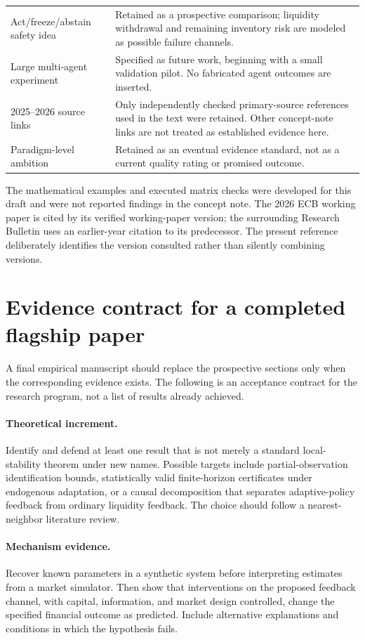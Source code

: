 \documentclass[11pt,a4paper]{article}
\theoremstyle{definition}
\theoremstyle{remark}
\begin{document}
\begin{longtable}{p{}p{}}
Act/freeze/abstain safety idea & Retained as a prospective comparison; liquidity withdrawal and remaining inventory risk are modeled as possible failure channels.\\
Large multi-agent experiment & Specified as future work, beginning with a small validation pilot. No fabricated agent outcomes are inserted.\\
2025--2026 source links & Only independently checked primary-source references used in the text were retained. Other concept-note links are not treated as established evidence here.\\
Paradigm-level ambition & Retained as an eventual evidence standard, not as a current quality rating or promised outcome.\\
\end{longtable}
The mathematical examples and executed matrix checks were developed for this draft and were not reported findings in the concept note. The 2026 ECB working paper is cited by its verified working-paper version; the surrounding Research Bulletin uses an earlier-year citation to its predecessor. The present reference deliberately identifies the version consulted rather than silently combining versions.

\clearpage
\section{Evidence contract for a completed flagship paper}
\label{app:contract}
A final empirical manuscript should replace the prospective sections only when the corresponding evidence exists. The following is an acceptance contract for the research program, not a list of results already achieved.

\paragraph{Theoretical increment.}
Identify and defend at least one result that is not merely a standard local-stability theorem under new names. Possible targets include partial-observation identification bounds, statistically valid finite-horizon certificates under endogenous adaptation, or a causal decomposition that separates adaptive-policy feedback from ordinary liquidity feedback. The choice should follow a nearest-neighbor literature review.

\paragraph{Mechanism evidence.}
Recover known parameters in a synthetic system before interpreting estimates from a market simulator. Then show that interventions on the proposed feedback channel, with capital, information, and market design controlled, change the specified financial outcome as predicted. Include alternative explanations and conditions in which the hypothesis fails.
\end{document}
